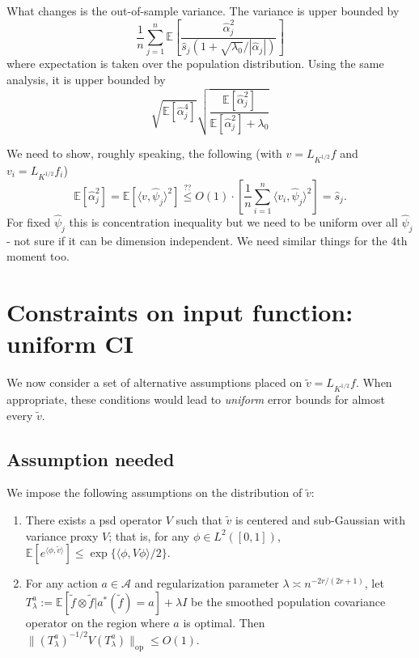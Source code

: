 \documentclass[11pt,a4paper]{article}
\renewcommand{\hat}{\widehat}
\renewcommand{\tilde}{\widetilde}
\theoremstyle{definition}
\theoremstyle{plain}
\theoremstyle{remark}
\newcommand{\op}{\mathrm{op}}
\newcommand{\mA}{\mathcal A}
\begin{document}
What changes is the out-of-sample variance. The variance is upper bounded by 
$$
\frac{1}{n}\sum_{j=1}^n\mathbb E\left[\frac{\hat\alpha_j^2}{\hat s_j(1+\sqrt{\lambda_0}/|\hat\alpha_j|)}\right]
$$
where expectation is taken over the population distribution. Using the same analysis, it is upper bounded by
$$
\sqrt{\mathbb E[\hat\alpha_j^4]}\sqrt{\frac{\mathbb E[\hat\alpha_j^2]}{\mathbb E[\hat\alpha_j^2]+\lambda_0}}
$$

{\color{blue}
We need to show, roughly speaking, the following (with $v=L_{K^{1/2}}f$ and $v_i=L_{K^{1/2}}f_i$)
$$
\mathbb E[\hat\alpha_j^2] = \mathbb E[\langle v, \hat\psi_j\rangle^2] \overset{??}{\leq} O(1)\cdot \left[\frac{1}{n}\sum_{i=1}^n \langle v_i, \hat\psi_j\rangle^2\right] = \hat s_j.
$$
For fixed $\hat\psi_j$ this is concentration inequality but we need to be uniform over all $\hat\psi_j$ - not sure if it can be dimension independent.
We need similar things for the 4th moment too.
}

\section{Constraints on input function: uniform CI}\label{sec:uniform}

We now consider a set of alternative assumptions placed on $\tilde v=L_{K^{1/2}}f$. When appropriate, these conditions would lead to \emph{uniform} error bounds for almost every $\tilde v$.

\subsection{Assumption needed}

We impose the following assumptions on the distribution of $\tilde v$:
\begin{enumerate}
\item There exists a psd operator $V$ such that $\tilde v$ is centered and sub-Gaussian with variance proxy $V$; that is, for any $\phi\in L^2([0,1])$, $\mathbb E[e^{\langle\phi,\tilde v\rangle}] \leq \exp\{\langle\phi, V\phi\rangle/2\}$.
\item For any action $a\in\mA$ and regularization parameter $\lambda\asymp n^{-2r/(2r+1)}$, let $T_\lambda^a := \mathbb E[\tilde f\otimes\tilde f| a^*(\tilde f)=a] + \lambda I$ be the smoothed population covariance operator on the region where $a$ is optimal. Then $\|(T_\lambda^a)^{-1/2} V (T_\lambda^a)\|_\op \leq O(1)$.
\end{enumerate}
\end{document}
